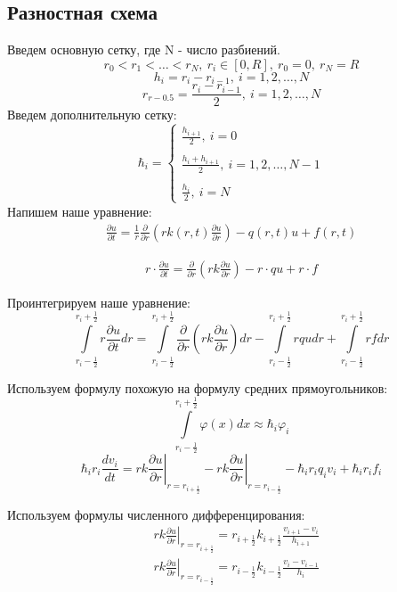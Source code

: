 \subsection{Разностная схема}
Введем основную сетку, где N - число разбиений.
\[ 
  r_0 < r_1 < \dots < r_N,\ r_i \in [0, R],\ r_0 = 0,\ r_N = R
\]
\[
  h_i =r_i - r_{i-1},\ i=1,2, \dots, N
\]
\[
  r_{r-0.5} = \frac{r_i - r_{i-1}}{2},\ i=1,2, \dots, N
\]
Введем дополнительную сетку:
\[
  \hbar_i = \begin{cases}
    \frac{h_{i+1}}{2},\ i = 0 \\ \\
    \frac{h_i + h_{i+1}}{2},\ i = 1, 2, \dots, N-1 \\ \\
    \frac{h_i}{2},\ i = N
  \end{cases}
\]
Напишем наше уравнение:
\begin{align*}
  \frac{\partial u}{\partial t} = \frac{1}{r} \frac{\partial}{\partial r}
  \left ( rk(r, t)\frac{\partial u}{\partial r} \right ) - q(r, t)u + f(r,t)
\end{align*}

\begin{align*}
  r \cdot \frac{\partial u}{\partial t} = \frac{\partial}{\partial r}
  \left ( rk\frac{\partial u}{\partial r} \right ) - r \cdot qu + r \cdot f
\end{align*}

Проинтегрируем наше уравнение:
\[
  \int\limits^{r_i+\frac{1}{2}}_{r_i-\frac{1}{2}} r \frac{\partial u}{\partial t} dr =
  \int\limits^{r_i+\frac{1}{2}}_{r_i-\frac{1}{2}} \frac{\partial}{\partial r} \left ( rk\frac{\partial u}{\partial r} \right ) dr
  - \int\limits^{r_i+\frac{1}{2}}_{r_i-\frac{1}{2}} rqu dr + \int\limits^{r_i+\frac{1}{2}}_{r_i-\frac{1}{2}} rf dr
\]

Используем формулу похожую на формулу средних прямоугольников:
\[
  \int\limits^{r_i+\frac{1}{2}}_{r_i-\frac{1}{2}} \varphi(x)dx \approx \hbar_i \varphi_i
\]
\[
  \hbar_i r_i \frac{d v_i}{dt} = \left . rk \frac{\partial u}{\partial r} \right \vert_{r=r_{i+\frac{1}{2}}}
  - \left . rk \frac{\partial u}{\partial r} \right \vert_{r=r_{i-\frac{1}{2}}} -\hbar_i r_i q_i v_i + \hbar_i r_i f_i
\]

Используем формулы численного дифференцирования:
\begin{align*}
  &\left . rk \frac{\partial u}{\partial r} \right \vert_{r=r_{i+\frac{1}{2}}} = r_{i + \frac{1}{2}} k_{i + \frac{1}{2}} \frac{v_{i+1}-v_i}{h_{i + 1}} \\
  &\left . rk \frac{\partial u}{\partial r} \right \vert_{r=r_{i-\frac{1}{2}}} = r_{i - \frac{1}{2}} k_{i - \frac{1}{2}} \frac{v_{i}-v_{i-1}}{h_{i}}
\end{align*}

